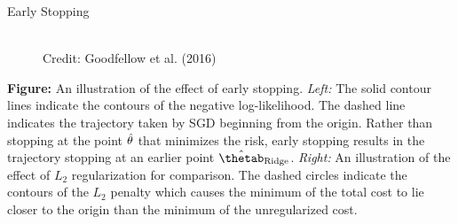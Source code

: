 \begin{vbframe}{Early Stopping}
  \begin{figure}
    \centering
      \tiny{\\ Credit: Goodfellow et al. (2016)\\}
  \end{figure}
  
\footnotesize 
\textbf{Figure:} An illustration of the effect of early stopping. \textit{Left:} The solid contour lines indicate the contours of the negative log-likelihood. The dashed line indicates the trajectory taken by SGD beginning from the origin. Rather than stopping at the point $\hat{\theta}$ that minimizes the risk, early stopping results in the trajectory stopping at an earlier point $\hat{\thetab}_{\text{Ridge}}$. \textit{Right:} An illustration of the effect of $L_2$ regularization for comparison. The dashed circles indicate the contours of the $L_2$ penalty which causes the minimum of the total cost to lie closer to the origin than the minimum of the unregularized cost.
\end{vbframe}



\endlecture
